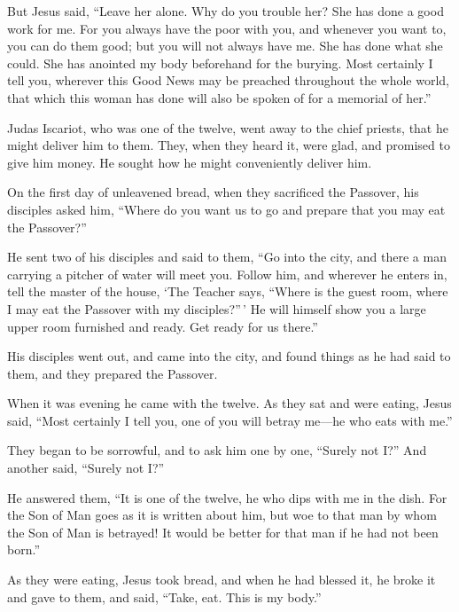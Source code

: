  But Jesus said, ``Leave her alone. Why do you trouble her?
She has done a good work for me.  For you always have the
poor with you, and whenever you want to, you can do them good; but you
will not always have me.  She has done what she could. She
has anointed my body beforehand for the burying.  Most
certainly I tell you, wherever this Good News may be preached throughout
the whole world, that which this woman has done will also be spoken of
for a memorial of her.''

 Judas Iscariot, who was one of the twelve, went away to
the chief priests, that he might deliver him to them. 
They, when they heard it, were glad, and promised to give him money. He
sought how he might conveniently deliver him.

 On the first day of unleavened bread, when they sacrificed
the Passover, his disciples asked him, ``Where do you want us to go and
prepare that you may eat the Passover?''

 He sent two of his disciples and said to them, ``Go into
the city, and there a man carrying a pitcher of water will meet you.
Follow him,  and wherever he enters in, tell the master of
the house, `The Teacher says, ``Where is the guest room, where I may eat
the Passover with my disciples?''\,'  He will himself show
you a large upper room furnished and ready. Get ready for us there.''

 His disciples went out, and came into the city, and found
things as he had said to them, and they prepared the Passover.

 When it was evening he came with the twelve. 
As they sat and were eating, Jesus said, ``Most certainly I tell you,
one of you will betray me---he who eats with me.''

 They began to be sorrowful, and to ask him one by one,
``Surely not I?'' And another said, ``Surely not I?''

 He answered them, ``It is one of the twelve, he who dips
with me in the dish.  For the Son of Man goes as it is
written about him, but woe to that man by whom the Son of Man is
betrayed! It would be better for that man if he had not been born.''

 As they were eating, Jesus took bread, and when he had
blessed it, he broke it and gave to them, and said, ``Take, eat. This is
my body.''


